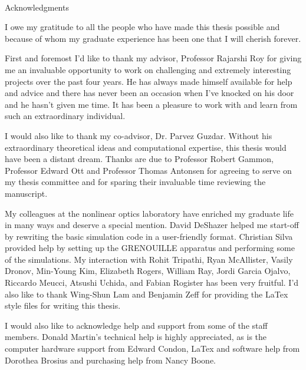 
\renewcommand{\baselinestretch}{2}

\small\normalsize
\hbox{\ }

\vspace*{-.85in}

\begin{center}
\large{Acknowledgments}
\end{center}

\vspace{1ex}

I owe my gratitude to all the people who have made this thesis possible and because of whom my graduate experience has been one that I will cherish forever.

First and foremost I'd like to thank my advisor, Professor Rajarshi Roy for giving me an invaluable opportunity to work on challenging and extremely interesting projects over the past four years. He has always made himself available for help and advice and there has never been an occasion when I've knocked on his door and he hasn't given me time. It has been a pleasure to work with and learn from such an extraordinary individual.

I would also like to thank my co-advisor, Dr. Parvez Guzdar. Without his extraordinary theoretical ideas and computational expertise, this thesis would have been a distant dream. Thanks are due to Professor Robert Gammon, Professor Edward Ott and Professor Thomas Antonsen for agreeing to serve on my thesis committee and for sparing their invaluable time reviewing the manuscript.

My colleagues at the nonlinear optics laboratory have enriched my graduate life in many ways and deserve a special mention. David DeShazer helped me start-off by rewriting the basic simulation code in a user-friendly format. Christian Silva provided help by setting up the GRENOUILLE apparatus and performing some of the simulations. My interaction with  Rohit Tripathi, Ryan McAllister, Vasily Dronov, Min-Young Kim, Elizabeth Rogers, William Ray, Jordi Garcia Ojalvo, Riccardo Meucci, Atsushi Uchida, and Fabian Rogister has been very fruitful. I'd also like to thank Wing-Shun Lam and Benjamin Zeff for providing the LaTex style files for writing this thesis.

I would also like to acknowledge help and support from some of the staff members. Donald Martin's technical help is highly appreciated, as is the computer hardware support from Edward Condon, LaTex and software help from Dorothea Brosius and purchasing help from Nancy Boone.

